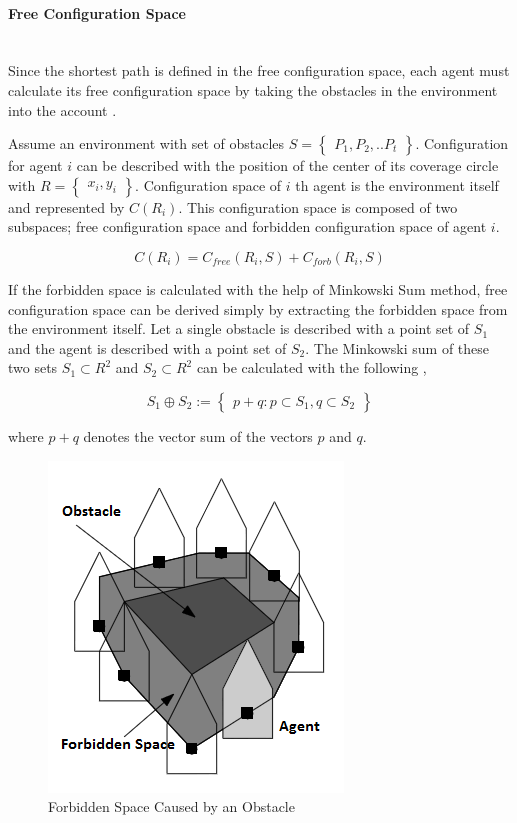 \paragraph{Free Configuration Space}\hspace{0pt} \\
Since the shortest path is defined in the free configuration space, each agent must calculate its free configuration space by taking the obstacles in the environment into the account \cite{92}. 

Assume an environment with set of obstacles $S = \begin{Bmatrix}
P_1, P_2, .. P_t \end{Bmatrix}$. Configuration for agent $i$ can be described with the position of the center of its coverage circle with $R=\begin{Bmatrix}x_i, y_i\end{Bmatrix}$. Configuration space of $i$ th agent is the environment itself and represented by $C(R_i)$. This configuration space is composed of two subspaces; free configuration space and forbidden configuration space of agent $i$.

\begin{equation}
C(R_i) = C_{free}(R_i,S) + C_{forb}(R_i,S)
\end{equation}

If the forbidden space is calculated with the help of Minkowski Sum method, free configuration space can be derived simply by extracting the forbidden space from the environment itself. Let a single obstacle is described with a point set of $S_1$ and the agent is described with a point set of $S_2$. The Minkowski sum of these two sets $S_1 \subset R^2$ and $S_2 \subset R^2$ can be calculated with the following \cite{92},
	
\begin{equation}
S_1 \oplus S_2 := \begin{Bmatrix}
p+q : p \subset S_1, q \subset S_2
\end{Bmatrix} 
\end{equation}

where $p+q$ denotes the vector sum of the vectors $p$ and $q$.
		
\begin{figure}[H]
\caption{Forbidden Space Caused by an Obstacle \cite{92}} \label{yasakli_bolge}
\centering
\includegraphics[scale = 0.6]{Forbidden}
\end{figure}
	
